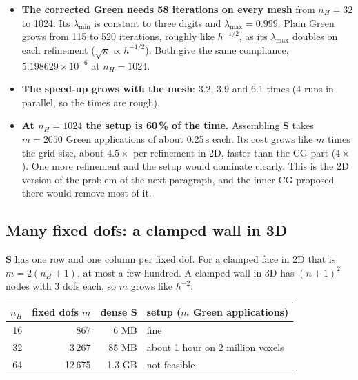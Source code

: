 \documentclass[11pt,a4paper]{article}
\begin{document}
\begin{itemize}
  \item \textbf{The corrected Green needs 58 iterations on every mesh} from $n_H = 32$ to 1024. Its $\lambda_{\min}$ is
        constant to three digits and $\lambda_{\max} = 0.999$. Plain Green grows from 115 to 520 iterations, roughly like
        $h^{-1/2}$, as its $\lambda_{\max}$ doubles on each refinement ($\sqrt{\kappa} \propto h^{-1/2}$). Both give the
        same compliance, $5.198629\times10^{-6}$ at $n_H = 1024$.
  \item \textbf{The speed-up grows with the mesh}: 3.2, 3.9 and 6.1 times (4 runs in parallel, so the times are rough).
  \item \textbf{At $n_H = 1024$ the setup is 60\,\% of the time.} Assembling $\mathbf{S}$ takes $m = 2050$ Green
        applications of about 0.25\,s each. Its cost grows like $m$ times the grid size, about $4.5\times$ per refinement
        in 2D, faster than the CG part ($4\times$). One more refinement and the setup would dominate clearly. This is the
        2D version of the problem of the next paragraph, and the inner CG proposed there would remove most of it.
\end{itemize}

\subsection*{Many fixed dofs: a clamped wall in 3D}
\label{sec:large_m}

$\mathbf{S}$ has one row and one column per fixed dof. For a clamped face in 2D that is $m = 2(n_H+1)$, at most a few
hundred. A clamped wall in 3D has $(n+1)^2$ nodes with 3 dofs each, so $m$ grows like $h^{-2}$:

\begin{center}
\small
\begin{tabular}{rrrl}
  \toprule
  $n_H$ & fixed dofs $m$ & dense $\mathbf{S}$ & setup ($m$ Green applications) \\
  \midrule
  16 & 867    & 6 MB   & fine \\
  32 & 3\,267  & 85 MB  & about 1 hour on 2 million voxels \\
  64 & 12\,675 & 1.3 GB & not feasible \\
  \bottomrule
\end{tabular}
\end{center}
\end{document}
